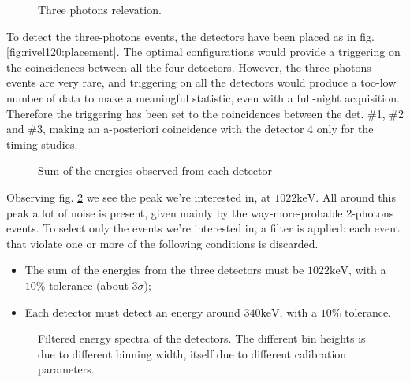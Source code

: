 \documentclass[11pt,a4 paper]{article}
\begin{document}
\begin{figure}[H]
    \centering
    { \label{fig:rivel120:placement}} \quad
    {}
    \caption{Three photons relevation.}
    \label{fig:rivel120}
\end{figure}

To detect the three-photons events, the detectors have been placed as in fig. \ref{fig:rivel120:placement}. The optimal configurations would provide a triggering on the coincidences between all the four detectors. However, the three-photons events are very rare, and triggering on all the detectors would produce a too-low number of data to make a meaningful statistic, even with a full-night acquisition. Therefore the triggering has been set to the coincidences between the det. \#1, \#2 and \#3, making an a-posteriori coincidence with the detector 4 only for the timing studies.

\begin{figure}[H]
    \centering
    \caption{Sum of the energies observed from each detector}
    \label{fig:sum:3gamma}
\end{figure}

Observing fig. \ref{fig:sum:3gamma} we see the peak we're interested in, at $1022\si{\kilo\electronvolt}$. All around this peak a lot of noise is present, given mainly by the way-more-probable 2-photons events. To select only the events we're interested in, a filter is applied: each event that violate one or more of the following conditions is discarded.
\begin{itemize}
    \item The sum of the energies from the three detectors must be $1022\si{\kilo\electronvolt}$, with a $10\%$ tolerance (about $3\sigma$);
    \item Each detector must detect an energy around $340\si{\kilo\electronvolt}$, with a $10\%$ tolerance.
\end{itemize}

\begin{figure}[H]
    \centering
    \caption{Filtered energy spectra of the detectors. The different bin heights is due to different binning width, itself due to different calibration parameters.}
    \label{fig:alldet:3gamma}
\end{figure}
\end{document}
